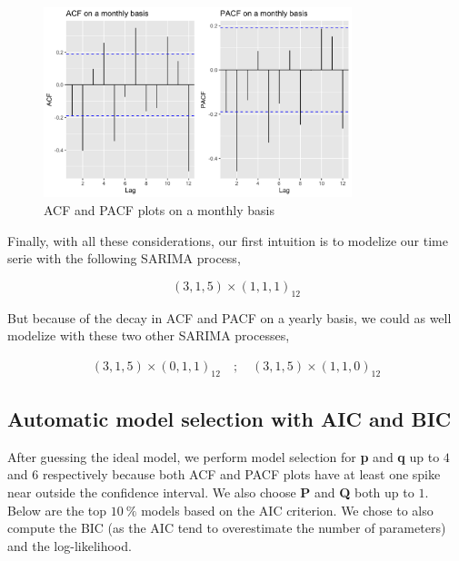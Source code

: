 \begin{figure}[H]
	\centering
	\includegraphics[width=0.8\textwidth]{figures/box_jenkins/monthly_acf_pacf.png}
	\caption{ACF and PACF plots on a monthly basis}
	\label{fig:monthly-acf-pacf}
\end{figure}

Finally, with all these considerations, our first intuition is to modelize our time serie with the following SARIMA process,

\begin{equation}
	(3, 1, 5) \times (1, 1, 1)_{12}
\end{equation}

But because of the decay in ACF and PACF on a yearly basis, we could as well modelize with these two other SARIMA processes,

\begin{equation}
	\begin{array}{rl}
		(3, 1, 5) \times (0, 1, 1)_{12} \quad ; \quad (3, 1, 5) \times (1, 1, 0)_{12}
	\end{array}
\end{equation}

\subsection{Automatic model selection with AIC and BIC}

After guessing the ideal model, we perform model selection for \textbf{p} and \textbf{q} up to $4$ and $6$ respectively because both ACF and PACF plots have at least one spike near outside the confidence interval. We also choose \textbf{P} and \textbf{Q} both up to $1$. Below are the top $\SI{10}{\%}$ models based on the AIC criterion. We chose to also compute the BIC (as the AIC tend to overestimate the number of parameters) and the log-likelihood.

